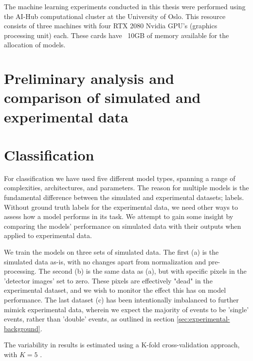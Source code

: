 The machine learning experiments conducted in this thesis were performed
using the AI-Hub computational cluster at the University of Oslo. This resource 
consists of three machines with four RTX 2080 Nvidia GPU’s (graphics
processing unit) each. These cards have ~10GB of memory available for the
allocation of models.

\section{Preliminary analysis and comparison of simulated and experimental data}


\section{Classification}
For classification we have used five different model types,
spanning a range of complexities, architectures, and parameters.
The reason for multiple models is the fundamental difference between the
simulated and experimental datasets; labels. Without ground truth labels
for the experimental data, we need other ways to assess how a model performs in
its task. We attempt to gain some insight by comparing the models' performance on
simulated data with their outputs when applied to experimental data.

\noindent We train the models on three sets of simulated data.
The first (a) is the simulated data as-is, with no changes apart from normalization
and pre-processing. The second (b) is the same data as (a), but with specific pixels in
the 'detector images' set to zero. These pixels are effectively "dead" in the
experimental dataset, and we wish to monitor the effect this has on model performance.
The last dataset (c) has been intentionally imbalanced to further mimick experimental data,
wherein we expect the majority of events to be 'single' events, rather than 'double'
events, as outlined in section \ref{sec:experimental-background}.

\noindent The variability in results is estimated using a K-fold cross-validation approach, with
$K = 5$ \cite{Stone1974}.

